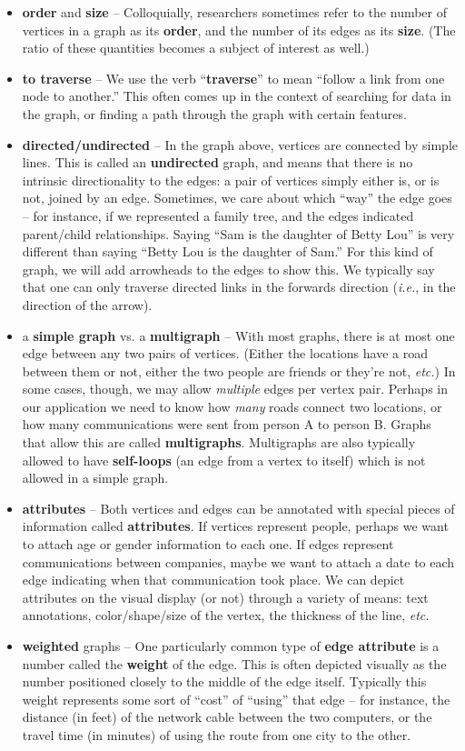 \documentclass[12pt]{article}
\begin{document}
\begin{itemize}
\itemsep.1em
\item \textbf{order} and \textbf{size} -- Colloquially, researchers sometimes
refer to the number of vertices in a graph as its \textbf{order}, and the
number of its edges as its \textbf{size}. (The ratio of these quantities
becomes a subject of interest as well.)
\item \textbf{to traverse} -- We use the verb ``\textbf{traverse}'' to mean
``follow a link from one node to another.'' This often comes up in the context
of searching for data in the graph, or finding a path through the graph with
certain features.
\item \textbf{directed/undirected} -- In the graph above, vertices are
connected by simple lines. This is called an \textbf{undirected} graph, and
means that there is no intrinsic directionality to the edges: a pair of
vertices simply either is, or is not, joined by an edge. Sometimes, we care
about which ``way'' the edge goes -- for instance, if we represented a family
tree, and the edges indicated parent/child relationships. Saying ``Sam is the
daughter of Betty Lou'' is very different than saying ``Betty Lou is the
daughter of Sam.'' For this kind of graph, we will add arrowheads to the edges
to show this. We typically say that one can only traverse directed links in
the forwards direction (\textit{i.e.}, in the direction of the arrow).
\item a \textbf{simple graph} vs. a \textbf{multigraph} -- With most graphs,
there is at most one edge between any two pairs of vertices. (Either the
locations have a road between them or not, either the two people are friends
or they're not, \textit{etc.}) In some cases, though, we may allow
\textit{multiple} edges per vertex pair. Perhaps in our application we need to
know how \textit{many} roads connect two locations, or how many communications
were sent from person A to person B. Graphs that allow this are called
\textbf{multigraphs}. Multigraphs are also typically allowed to have
\textbf{self-loops} (an edge from a vertex to itself) which is not allowed in
a simple graph.
\item \textbf{attributes} -- Both vertices and edges can be annotated with
special pieces of information called \textbf{attributes}. If vertices
represent people, perhaps we want to attach age or gender information to each
one. If edges represent communications between companies, maybe we want to
attach a date to each edge indicating when that communication took place. We
can depict attributes on the visual display (or not) through a variety of
means: text annotations, color/shape/size of the vertex, the thickness of the
line, \textit{etc.}
\item \textbf{weighted} graphs -- One particularly common type of \textbf{edge
attribute} is a number called the \textbf{weight} of the edge. This is often
depicted visually as the number positioned closely to the middle of the edge
itself. Typically this weight represents some sort of ``cost'' of ``using'' that
edge -- for instance, the distance (in feet) of the network cable between the
two computers, or the travel time (in minutes) of using the route from one
city to the other.
\end{itemize}
\end{document}
